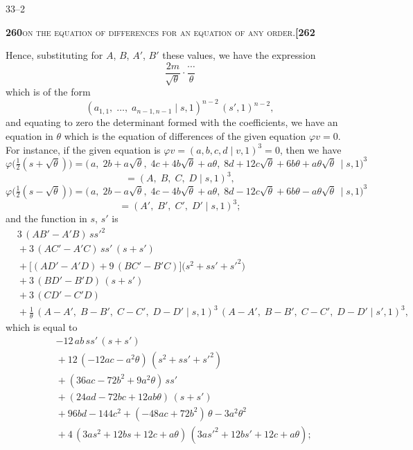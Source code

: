 \documentclass[11pt]{article}
\newcommand{\Cdel}{\mid}
\begin{document}
\medskip

\noindent\hfill 33--2

\newpage
\setcounter{page}{260}

\noindent\textbf{260}\hfill\textsc{on the equation of differences for an equation of any order.}\hfill\textbf{[262}

\medskip

\noindent Hence, substituting for $A$, $B$, $A'$, $B'$ these values, we have the expression
\[
   \frac{2m}{\sqrt{\theta}}\cdot\frac{\cdots}{\theta}
\]
which is of the form
\[
   (a_{1,1},\; \ldots,\; a_{n-1,n-1} \Cdel s, 1)^{n-2}\,(s', 1)^{n-2},
\]
and equating to zero the determinant formed with the coefficients, we have an equation in $\theta$ which is the equation of differences of the given equation $\varphi v = 0$. For instance, if the given equation is $\varphi v = (a, b, c, d \Cdel v, 1)^3 = 0$, then we have
\[
   \varphi\bigl(\tfrac{1}{2}(s + \sqrt{\theta})\bigr) = \bigl(\,a,\; 2 b + a\sqrt{\theta},\; 4 c + 4 b\sqrt{\theta} + a\theta,\; 8 d + 12 c\sqrt{\theta} + 6 b\theta + a\theta\sqrt{\theta}\,\Cdel s, 1\bigr)^3
\]
\[
   = (A,\; B,\; C,\; D \Cdel s, 1)^3,
\]
\[
   \varphi\bigl(\tfrac{1}{2}(s - \sqrt{\theta})\bigr) = \bigl(\,a,\; 2 b - a\sqrt{\theta},\; 4 c - 4 b\sqrt{\theta} + a\theta,\; 8 d - 12 c\sqrt{\theta} + 6 b\theta - a\theta\sqrt{\theta}\,\Cdel s, 1\bigr)^3
\]
\[
   = (A',\; B',\; C',\; D' \Cdel s, 1)^3;
\]
and the function in $s$, $s'$ is
\[
\begin{aligned}
   & 3\,(AB' - A'B)\,s s'^2\\
   & {}+ 3\,(AC' - A'C)\,s s'\,(s + s')\\
   & {}+ \bigl[(AD' - A'D) + 9\,(BC' - B'C)\bigr]\bigl(s^2 + s s' + s'^2\bigr)\\
   & {}+ 3\,(BD' - B'D)\,(s + s')\\
   & {}+ 3\,(CD' - C'D)\\[3pt]
   & {}+ \tfrac{1}{\theta}\,(A - A',\; B - B',\; C - C',\; D - D' \Cdel s, 1)^3\,(A - A',\; B - B',\; C - C',\; D - D' \Cdel s', 1)^3,
\end{aligned}
\]
which is equal to
\[
\begin{aligned}
   & -12\,a b\,s s'\,(s + s')\\
   & {}+ 12\,(-12 a c - a^2\theta)\,(s^2 + s s' + s'^2)\\
   & {}+ (36 a c - 72 b^2 + 9 a^2\theta)\,s s'\\
   & {}+ (24 a d - 72 b c + 12 a b\theta)\,(s + s')\\
   & {}+ 96 b d - 144 c^2 + (-48 a c + 72 b^2)\,\theta - 3 a^2\theta^2\\[3pt]
   & {}+ 4\,(3 a s^2 + 12 b s + 12 c + a\theta)\,(3 a s'^2 + 12 b s' + 12 c + a\theta);
\end{aligned}
\]
\end{document}
